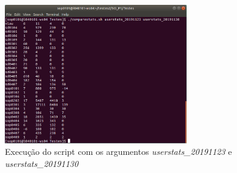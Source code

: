 \documentclass[10pt,portuguese]{article}
\begin{document}
\begin{figure}[!h]
    \centering
    \includegraphics[width=300]{Resultados/normal_c.jpeg}
    \caption{Execução do script com os argumentos \textit{userstats\_20191123} e \textit{userstats\_20191130}}
\end{figure}
\end{document}

